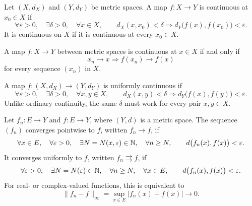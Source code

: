     \begin{definition}
        Let $(X,d_X)$ and $(Y,d_Y)$ be metric spaces. A map $f:X\to Y$ is
        continuous at $x_0\in X$ if
        \[
            \forall\varepsilon>0,
            \quad
            \exists\delta>0,
            \quad
            \forall x\in X,
            \qquad
            d_X(x,x_0)<\delta
            \Rightarrow
            d_Y\bigl(f(x),f(x_0)\bigr)<\varepsilon.
        \]
        It is continuous on $X$ if it is continuous at every $x_0\in X$.
    \end{definition}

    \begin{theorem}
        A map $f:X\to Y$ between metric spaces is continuous at $x\in X$ if
        and only if
        \[
            x_n\to x
            \Rightarrow
            f(x_n)\to f(x)
        \]
        for every sequence $(x_n)$ in $X$.
    \end{theorem}

    \begin{definition}
        A map $f:(X,d_X)\to(Y,d_Y)$ is uniformly continuous if
        \[
            \forall\varepsilon>0,
            \quad
            \exists\delta>0,
            \quad
            \forall x,y\in X,
            \qquad
            d_X(x,y)<\delta
            \Rightarrow
            d_Y\bigl(f(x),f(y)\bigr)<\varepsilon.
        \]
        Unlike ordinary continuity, the same $\delta$ must work for every pair
        $x,y\in X$.
    \end{definition}

    \begin{definition}
        Let $f_n:E\to Y$ and $f:E\to Y$, where $(Y,d)$ is a metric space. The
        sequence $(f_n)$ converges pointwise to $f$, written
        $f_n\to f$, if
        \[
            \forall x\in E,
            \quad
            \forall\varepsilon>0,
            \quad
            \exists N=N(x,\varepsilon)\in\mathbb{N},
            \quad
            \forall n\geq N,
            \qquad
            d\bigl(f_n(x),f(x)\bigr)<\varepsilon.
        \]
        It converges uniformly to $f$, written $f_n\rightrightarrows f$, if
        \[
            \forall\varepsilon>0,
            \quad
            \exists N=N(\varepsilon)\in\mathbb{N},
            \quad
            \forall n\geq N,
            \quad
            \forall x\in E,
            \qquad
            d\bigl(f_n(x),f(x)\bigr)<\varepsilon.
        \]
        For real- or complex-valued functions, this is equivalent to
        \[
            \|f_n-f\|_\infty
            =
            \sup_{x\in E}|f_n(x)-f(x)|
            \longrightarrow 0.
        \]
    \end{definition}

